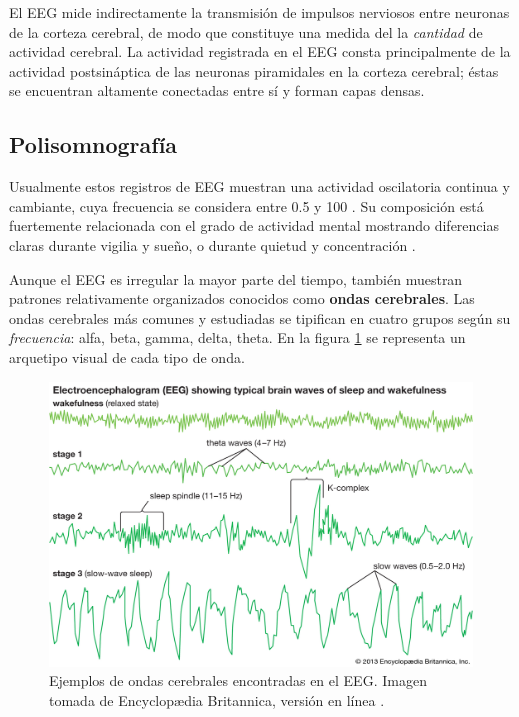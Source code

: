 El EEG mide indirectamente la transmisión de impulsos nerviosos entre neuronas de la corteza 
cerebral, de modo que constituye una medida del la \textit{cantidad} de actividad cerebral. 
%
La actividad registrada en el EEG consta principalmente de la actividad postsináptica de las 
neuronas piramidales en la corteza cerebral; éstas se encuentran altamente conectadas entre sí y
forman capas densas.


\subsection{Polisomnografía}

Usualmente estos registros de EEG muestran una actividad oscilatoria continua y cambiante, cuya
frecuencia se considera entre 0.5 y 100 \hz. Su composición está fuertemente relacionada con el 
grado de actividad mental mostrando diferencias claras durante vigilia y sueño, o durante quietud 
y concentración \cite{Clark98_2}.

Aunque el EEG es irregular la mayor parte del tiempo, también muestran patrones relativamente 
organizados conocidos como \textbf{ondas cerebrales}. 
%
Las ondas cerebrales más comunes y estudiadas se tipifican en cuatro grupos según su 
\textit{frecuencia}: alfa, beta, gamma, delta, theta.
%
En la figura \ref{ritmos} se representa un arquetipo visual de cada tipo de onda.

\begin{figure}
\centering
\includegraphics[width=0.95\linewidth]{./img_diagramas/ondas_britannica.jpg} 
\caption[Ejemplos de ondas cerebrales encontradas en el EEG]
{Ejemplos de ondas cerebrales encontradas en el EEG. Imagen tomada de Encyclop{\ae}dia Britannica, 
versión en línea \cite{Britannica}.}
\label{ritmos}
\end{figure}

